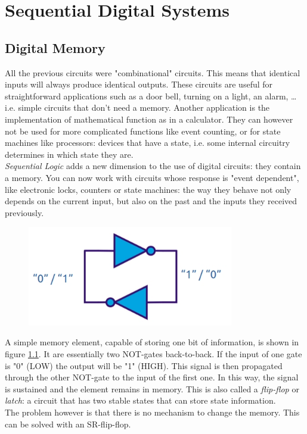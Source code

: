 \chapter{Sequential Digital Systems}
\section{Digital Memory}
All the previous circuits were "combinational" circuits. This means that identical inputs will always produce identical outputs. These circuits are useful for straightforward applications such as a door bell, turning on a light, an alarm, \ldots i.e. simple circuits that don't need a memory. Another application is the implementation of mathematical function as in a calculator. They can however not be used for more complicated functions like event counting, or for state machines like processors: devices that have a state, i.e. some internal circuitry determines in which state they are.\\
\emph{Sequential Logic} adds a new dimension to the use of digital circuits: they contain a memory. You can now work with circuits whose response is "event dependent", like electronic locks, counters or state machines: the way they behave not only depends on the current input, but also on the past and the inputs they received previously.

\begin{figure}[h!]
	\centering
	\includegraphics[width=9cm]{figures/ch17/mem_element.jpg}
	\caption{}
	\label{fig:mem_element}
\end{figure}

A simple memory element, capable of storing one bit of information, is shown in figure \ref{fig:mem_element}. It are essentially two NOT-gates back-to-back. If the input of one gate is "0" (LOW) the output will be "1" (HIGH). This signal is then propagated through the other NOT-gate to the input of the first one. In this way, the signal is sustained and the element remains in memory. This is also called a \emph{flip-flop} or \emph{latch}: a circuit that has two stable states that can store state information.\\
The problem however is that there is no mechanism to change the memory. This can be solved with an SR-flip-flop.

